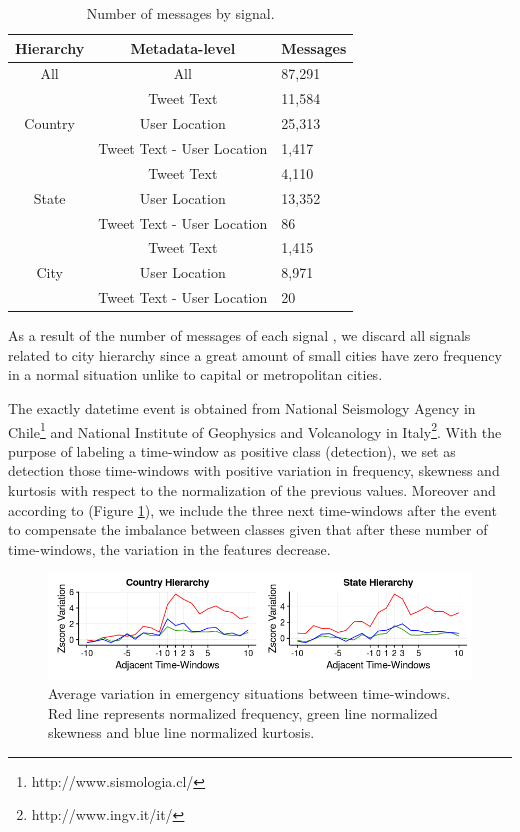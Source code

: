 \documentclass{llncs}
\begin{document}
\begin{table}
	\centering
	\caption{Number of messages by signal.}
	\label{tab:message_signal}
	\setlength\tabcolsep{8pt}
	\begin{tabular}{ccl}
		\toprule
		Hierarchy&Metadata-level&Messages\\
		\midrule
		All & All & 87,291 \\
		\midrule
		\multirow{3}{*}{Country} & Tweet Text & 11,584 \\
		& User Location & 25,313\\
		& Tweet Text - User Location & 1,417\\	
		\midrule
		\multirow{3}{*}{State} & Tweet Text & 4,110 \\
		& User Location & 13,352\\
		& Tweet Text - User Location & 86\\
		\midrule
		\multirow{3}{*}{City} & Tweet Text & 1,415 \\
		& User Location & 8,971\\
		& Tweet Text - User Location & 20\\
		\bottomrule
	\end{tabular}
\end{table} 

As a result of the number of messages of each signal , we discard all signals related to city hierarchy since a great amount of small cities have zero frequency in a normal situation unlike to capital or metropolitan cities.

The exactly datetime event is obtained from National Seismology Agency in Chile\footnote{http://www.sismologia.cl/} and 
National Institute of Geophysics and Volcanology in Italy\footnote{http://www.ingv.it/it/}. With the purpose of labeling a time-window as positive class (detection), we set as detection those time-windows with positive variation in frequency, skewness and kurtosis with respect to the normalization of the previous values. Moreover and according to (Figure \ref{fig:labeled}), we include the three next time-windows after the event to compensate the imbalance between classes given that after these number of time-windows, the variation in the features decrease.


\begin{figure}
	\centering
	\includegraphics[scale=0.6]{img/labeled.png}
	\caption{Average variation in emergency situations between time-windows. Red line represents normalized frequency, green line normalized skewness and blue line normalized kurtosis.}
	\label{fig:labeled}
\end{figure}
\end{document}
